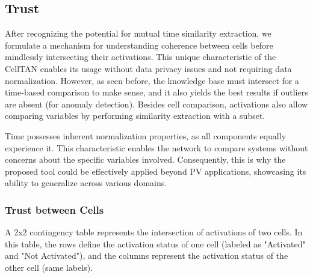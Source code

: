 

\subsection{Trust}  \label{subsec:trust}


After recognizing the potential for mutual time similarity extraction, we formulate a mechanism for understanding coherence between cells before mindlessly intersecting their activations. This unique characteristic of the CellTAN enables its usage without data privacy issues and not requiring data normalization. However, as seen before, the knowledge base must intersect for a time-based comparison to make sense, and it also yields the best results if outliers are absent (for anomaly detection). Besides cell comparison, activations also allow comparing variables by performing similarity extraction with a subset.

Time possesses inherent normalization properties, as all components equally experience it. This characteristic enables the network to compare systems without concerns about the specific variables involved. Consequently, this is why the proposed tool could be effectively applied beyond PV applications, showcasing its ability to generalize across various domains.

\subsubsection{Trust between Cells}

A 2x2 contingency table represents the intersection of activations of two cells. In this table, the rows define the activation status of one cell (labeled as "Activated" and "Not Activated"), and the columns represent the activation status of the other cell (same labels).

\begin{table}[h!]
    \centering
    \caption{Contigency table representing the activation intersection of two cells.}
    \label{tab:cellactivationsintersection}
\end{table}

